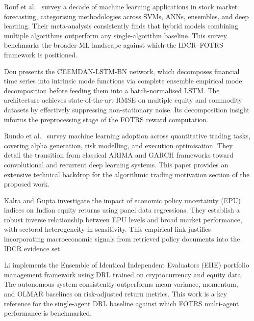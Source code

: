 \documentclass[12pt,a4paper,oneside]{report}
\theoremstyle{definition}
\theoremstyle{remark}
\begin{document}
\medskip

\noindent Rouf et al.\ \cite{Rouf2021Survey} survey a decade of machine learning applications in stock market forecasting, categorising methodologies across SVMs, ANNs, ensembles, and deep learning. Their meta-analysis consistently finds that hybrid models combining multiple algorithms outperform any single-algorithm baseline. This survey benchmarks the broader ML landscape against which the IDCR--FOTRS framework is positioned.

\medskip

\noindent Dou \cite{Dou2024CEEMDAN} presents the CEEMDAN-LSTM-BN network, which decomposes financial time series into intrinsic mode functions via complete ensemble empirical mode decomposition before feeding them into a batch-normalised LSTM. The architecture achieves state-of-the-art RMSE on multiple equity and commodity datasets by effectively suppressing non-stationary noise. Its decomposition insight informs the preprocessing stage of the FOTRS reward computation.

\medskip

\noindent Rundo et al.\ \cite{Rundo2019MLQuantFinance} survey machine learning adoption across quantitative trading tasks, covering alpha generation, risk modelling, and execution optimisation. They detail the transition from classical ARIMA and GARCH frameworks toward convolutional and recurrent deep learning systems. This paper provides an extensive technical backdrop for the algorithmic trading motivation section of the proposed work.

\medskip

\noindent Kalra and Gupta \cite{Kalra2023EPU} investigate the impact of economic policy uncertainty (EPU) indices on Indian equity returns using panel data regressions. They establish a robust inverse relationship between EPU levels and broad market performance, with sectoral heterogeneity in sensitivity. This empirical link justifies incorporating macroeconomic signals from retrieved policy documents into the IDCR evidence set.

\medskip

\noindent Li \cite{Li2024EIIEPortfolio} implements the Ensemble of Identical Independent Evaluators (EIIE) portfolio management framework using DRL trained on cryptocurrency and equity data. The autonomous system consistently outperforms mean-variance, momentum, and OLMAR baselines on risk-adjusted return metrics. This work is a key reference for the single-agent DRL baseline against which FOTRS multi-agent performance is benchmarked.
\end{document}
